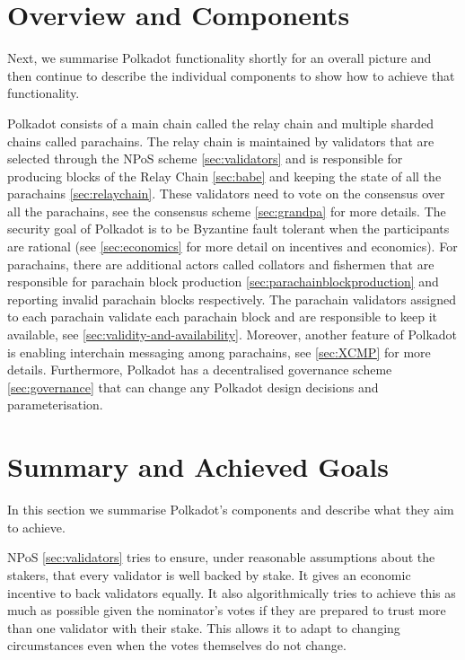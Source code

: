 \section{Overview and Components}\label{sec:components}
Next, we summarise Polkadot functionality shortly for an overall picture and then continue to describe the individual components to show how to achieve that functionality.

Polkadot consists of a main chain called the relay chain and multiple sharded chains called parachains. The relay chain is maintained by validators that are selected through the NPoS scheme \ref{sec:validators} and is responsible for producing blocks of the  Relay Chain \ref{sec:babe} and keeping the state of all the parachains \ref{sec:relaychain}.
These validators need to vote on the consensus over all the parachains, see the consensus scheme \ref{sec:grandpa} for more details.
The security goal of Polkadot is to be Byzantine fault tolerant when the participants are rational (see \ref{sec:economics} for more detail on incentives and economics).
For parachains, there are additional actors called collators and fishermen that are responsible for parachain block production \ref{sec:parachainblockproduction} and reporting invalid parachain blocks respectively.
The parachain validators assigned to each parachain validate each parachain block and are responsible to keep it available, see \ref{sec:validity-and-availability}. Moreover, another feature of Polkadot is enabling interchain messaging among parachains, see \ref{sec:XCMP} for more details.
Furthermore, Polkadot has a decentralised governance scheme \ref{sec:governance} that can change any Polkadot design decisions and parameterisation.










\section{Summary and Achieved Goals}
In this section we summarise Polkadot's components and describe what they aim to achieve. 

NPoS \ref{sec:validators} tries to ensure, under reasonable assumptions about the stakers, that every validator is well backed by stake. It gives an economic incentive to back validators equally. It also algorithmically tries to achieve this as much as possible given the nominator's votes if they are prepared to trust more than one validator with their stake.  This allows it to adapt to changing circumstances even when the votes themselves do not change.

